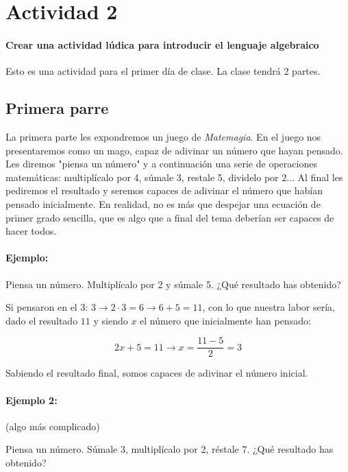 

\section{Actividad 2}

\paragraph{Crear una actividad lúdica para introducir el lenguaje algebraico}

Esto es una actividad para el primer día de clase. La clase tendrá 2 partes.

\subsection{Primera parre}


La primera parte les expondremos un juego de \textit{Matemagia}.
%
En el juego nos presentaremos como un mago, capaz de adivinar un número que hayan pensado.
%
Les diremos "piensa un número" y a continuación una serie de operaciones matemáticas: multiplícalo por 4, súmale 3, restale 5, dividelo por 2... 
%
Al final les pediremos el resultado y seremos capaces de adivinar el número que habían pensado inicialmente. 
%
En realidad, no es más que despejar una ecuación de primer grado sencilla, que es algo que a final del tema deberían ser capaces de hacer todos. 



\paragraph{Ejemplo:}

Piensa un número. Multiplícalo por 2 y súmale 5. ¿Qué resultado has obtenido? 

Si pensaron en el 3: $ 3\to 2·3 = 6\to 6+5 = 11 $, con lo que nuestra labor sería, dado el resultado $11$ y siendo $x$ el número que inicialmente han pensado:

\[
	2x+5 = 11 \to x = \frac{11-5}{2} = 3
\]

Sabiendo el resultado final, somos capaces de adivinar el número inicial.

\paragraph{Ejemplo 2:}(algo más complicado)

Piensa un número. Súmale 3, multiplícalo por 2, réstale 7. ¿Qué resultado has obtenido?

